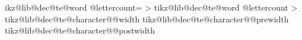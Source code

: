{      %
      \tikz@lib@dec@te@addto@parameters{\tikz@lib@dec@te@charactercount}{\tikz@lib@dec@te@wordsepfalse}%
       \expandafter\let\csname tikz@lib@dec@te@word \tikz@lib@dec@te@wordcount @lettercount\endcsname=\tikz@lib@dec@te@lettercount%
    \fi%
    \tikz@lib@dec@te@addmacroto@parameters{\tikz@lib@dec@te@charactercount}{\tikz@lib@dec@te@lettercount}%
    \tikz@lib@dec@te@addmacroto@parameters{\tikz@lib@dec@te@charactercount}{\tikz@lib@dec@te@wordcount}%
    \tikz@lib@dec@te@addmacroto@parameters{\tikz@lib@dec@te@charactercount}{\tikz@lib@dec@te@character}%
    \let\tikz@lib@dec@te@lastcharactercount=\pgfmathcounter%
  \repeatpgfmathloop%
  \let\tikz@lib@dec@te@wordtotalcount=\tikz@lib@dec@te@wordcount%
  \pgfmathloop
  \ifnum\pgfmathcounter>\tikz@lib@dec@te@charactertotalcount%
  \else%
    \tikz@lib@dec@te@addmacroto@parameters{\pgfmathcounter}{\tikz@lib@dec@te@charactertotalcount}%
    \tikz@lib@dec@te@addmacroto@parameters{\pgfmathcounter}{\tikz@lib@dec@te@wordtotalcount}%
    \expandafter\let\expandafter\tikz@lib@dec@te@lettertotalcount\expandafter=\csname tikz@lib@dec@te@word \tikz@lib@dec@te@wordcount @lettercount\endcsname%
    \tikz@lib@dec@te@addmacroto@parameters{\pgfmathcounter}{\tikz@lib@dec@te@lettertotalcount}%
  \repeatpgfmathloop%
  \def\tikz@lib@dec@te@textwidth{0pt}%
  \pgfmathloop%
  \ifnum\pgfmathcounter>\tikz@lib@dec@te@charactertotalcount%
  \else%
    \def\tikz@lib@dec@te@characterwidth{0pt}%
    \tikz@lib@dec@te@getcharacterwidth{\pgfmathcounter}%
    \expandafter\let\csname tikz@lib@dec@te@character@\pgfmathcounter @width\endcsname=\tikz@lib@dec@te@characterwidth%
    \pgf@x=\tikz@lib@dec@te@characterwidth\relax%
    \pgf@x%
    \expandafter\edef\csname tikz@lib@dec@te@character@\pgfmathcounter @prewidth\endcsname{\the\pgf@x}%
    \expandafter\edef\csname tikz@lib@dec@te@character@\pgfmathcounter @postwidth\endcsname{\the\pgf@x}%
    \tikz@lib@dec@te@advancedimenmacro{\tikz@lib@dec@te@textwidth}{\tikz@lib@dec@te@characterwidth}%
  \repeatpgfmathloop%
}

\def\tikz@lib@dec@te@spacetoken{ }

\let\tikz@lib@dec@te@wordsep=\tikz@lib@dec@te@spacetoken


%
%
%
\def\tikz@lib@dec@te@scancharacters#1{%
  \def\tikz@lib@dec@te@@@scancharacters@process{#1}%
  \def\tikz@lib@dec@te@scancount{0}%
  \expandafter\tikz@lib@dec@te@@scancharacters\tikz@lib@dec@te@text\tikz@lib@dec@te@scancharacters}%

